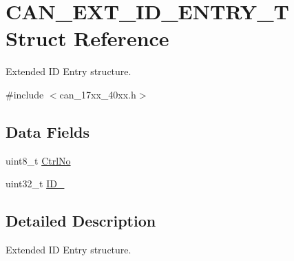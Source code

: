 \hypertarget{structCAN__EXT__ID__ENTRY__T}{\section{C\-A\-N\-\_\-\-E\-X\-T\-\_\-\-I\-D\-\_\-\-E\-N\-T\-R\-Y\-\_\-\-T Struct Reference}
\label{structCAN__EXT__ID__ENTRY__T}
}


Extended I\-D Entry structure.  




{\ttfamily \#include $<$can\-\_\-17xx\-\_\-40xx.\-h$>$}

\subsection*{Data Fields}
\begin{DoxyCompactItemize}
\item 
uint8\-\_\-t \hyperlink{structCAN__EXT__ID__ENTRY__T_ad8ed0ed8438c467abe045573bd079190}{Ctrl\-No}
\item 
uint32\-\_\-t \hyperlink{structCAN__EXT__ID__ENTRY__T_a3e67827310c81e3e17cb067dd25155b3}{I\-D\-\_}
\end{DoxyCompactItemize}


\subsection{Detailed Description}
Extended I\-D Entry structure. 

